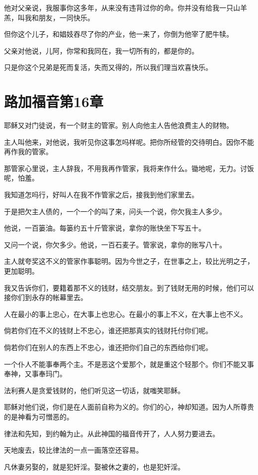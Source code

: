 \documentclass[12pt,oneside]{book}
\begin{document}
他对父亲说，我服事你这多年，从来没有违背过你的命。你并没有给我一只山羊羔，叫我和朋友，一同快乐。

但你这个儿子，和娼妓吞尽了你的产业，他一来了，你倒为他宰了肥牛犊。

父亲对他说，儿阿，你常和我同在，我一切所有的，都是你的。

只是你这个兄弟是死而复活，失而又得的，所以我们理当欢喜快乐。

\chapter{路加福音第16章}
耶稣又对门徒说，有一个财主的管家。别人向他主人告他浪费主人的财物。

主人叫他来，对他说，我听见你这事怎吗样呢。把你所经管的交待明白。因你不能再作我的管家。

那管家心里说，主人辞我，不用我再作管家，我将来作什么。锄地呢，无力。讨饭呢，怕羞。

我知道怎吗行，好叫人在我不作管家之后，接我到他们家里去。

于是把欠主人债的，一个一个的叫了来，问头一个说，你欠我主人多少。

他说，一百篓油。每篓约五十斤管家说，拿你的账快坐下写五十。

又问一个说，你欠多少。他说，一百石麦子。管家说，拿你的账写八十。

主人就夸奖这不义的管家作事聪明。因为今世之子，在世事之上，较比光明之子，更加聪明。

我又告诉你们，要籍着那不义的钱财，结交朋友。到了钱财无用的时候，他们可以接你们到永存的帐幕里去。

人在最小的事上忠心，在大事上也忠心。在最小的事上不义，在大事上也不义。

倘若你们在不义的钱财上不忠心，谁还把那真实的钱财托付你们呢。

倘若你们在别人的东西上不忠心，谁还把你们自己的东西给你们呢。

一个仆人不能事奉两个主。不是恶这个爱那个，就是重这个轻那个。你们不能又事奉神，又事奉玛门。

法利赛人是贪爱钱财的，他们听见这一切话，就嗤笑耶稣。

耶稣对他们说，你们是在人面前自称为义的。你们的心，神却知道。因为人所尊贵的是神看为可憎恶的。

律法和先知，到约翰为止。从此神国的福音传开了，人人努力要进去。

天地废去，较比律法的一点一画落空还容易。

凡休妻另娶的，就是犯奸淫。娶被休之妻的，也是犯奸淫。
\end{document}
